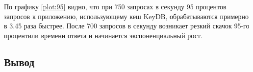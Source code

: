 По графику \ref{plot:95} видно, что при 750 запросах в секунду 95 процентов запросов к приложению, использующему кеш KeyDB, обрабатываются примерно в 3.45 раза быстрее.
После 700 запросов в секунду возникает резкий скачок 95-го процентили времени ответа и начинается экспоненциальный рост.

\subsection*{Вывод}
